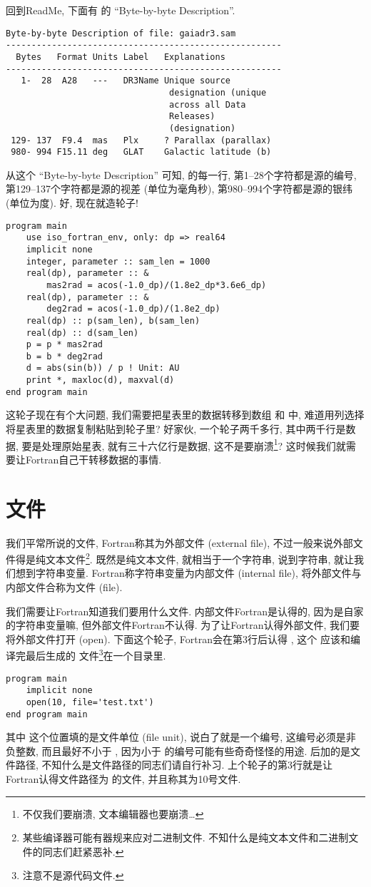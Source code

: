 回到ReadMe, 下面有   的 ``Byte-by-byte Description''. 
\begin{lstlisting}[numbers=none]
Byte-by-byte Description of file: gaiadr3.sam 
------------------------------------------------------
  Bytes   Format Units Label   Explanations
------------------------------------------------------
   1-  28  A28   ---   DR3Name Unique source
                                designation (unique
                                across all Data
                                Releases)
                                (designation)
 129- 137  F9.4  mas   Plx     ? Parallax (parallax)
 980- 994 F15.11 deg   GLAT    Galactic latitude (b)
\end{lstlisting}
从这个 ``Byte-by-byte Description'' 可知,  的每一行, 第1--28个字符都是源的编号, 第129--137个字符都是源的视差 (单位为毫角秒), 第980--994个字符都是源的银纬 (单位为度). 好, 现在就造轮子!\label{gaiadr3.sam}
\begin{lstlisting}
program main
    use iso_fortran_env, only: dp => real64
    implicit none
    integer, parameter :: sam_len = 1000
    real(dp), parameter :: &
        mas2rad = acos(-1.0_dp)/(1.8e2_dp*3.6e6_dp)
    real(dp), parameter :: &
        deg2rad = acos(-1.0_dp)/(1.8e2_dp)
    real(dp) :: p(sam_len), b(sam_len)
    real(dp) :: d(sam_len)
    p = p * mas2rad
    b = b * deg2rad
    d = abs(sin(b)) / p ! Unit: AU
    print *, maxloc(d), maxval(d)
end program main
\end{lstlisting}
这轮子现在有个大问题, 我们需要把星表里的数据转移到数组  和  中, 难道用列选择将星表里的数据复制粘贴到轮子里? 好家伙, 一个轮子两千多行, 其中两千行是数据, 要是处理原始星表, 就有三十六亿行是数据, 这不是要崩溃\footnote{不仅我们要崩溃, 文本编辑器也要崩溃\dots{}}? 这时候我们就需要让Fortran自己干转移数据的事情. 

\section{文件}

我们平常所说的文件, Fortran称其为外部文件 (external file), 不过一般来说外部文件得是纯文本文件\footnote{某些编译器可能有器规来应对二进制文件. 不知什么是纯文本文件和二进制文件的同志们赶紧恶补.}. 既然是纯文本文件, 就相当于一个字符串, 说到字符串, 就让我们想到字符串变量. Fortran称字符串变量为内部文件 (internal file), 将外部文件与内部文件合称为文件 (file). 

我们需要让Fortran知道我们要用什么文件. 内部文件Fortran是认得的, 因为是自家的字符串变量嘛, 但外部文件Fortran不认得. 为了让Fortran认得外部文件, 我们要将外部文件打开 (open). 下面这个轮子, Fortran会在第3行后认得 , 这个   应该和编译完最后生成的  文件\footnote{注意不是源代码文件.}在一个目录里. 
\begin{lstlisting}
program main
    implicit none
    open(10, file='test.txt')
end program main
\end{lstlisting}
其中  这个位置填的是文件单位 (file unit), 说白了就是一个编号, 这编号必须是非负整数, 而且最好不小于 , 因为小于  的编号可能有些奇奇怪怪的用途.    后加的是文件路径, 不知什么是文件路径的同志们请自行补习. 上个轮子的第3行就是让Fortran认得文件路径为   的文件, 并且称其为10号文件. 

